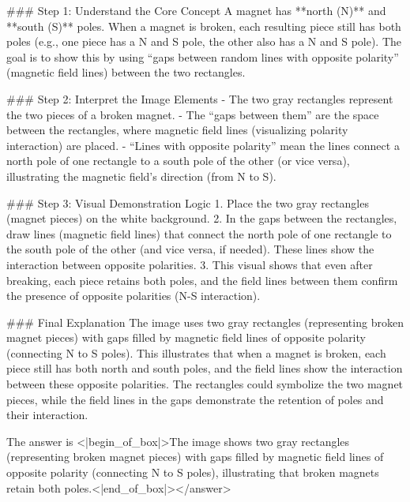 ### Step 1: Understand the Core Concept  
A magnet has **north (N)** and **south (S)** poles. When a magnet is broken, each resulting piece still has both poles (e.g., one piece has a N and S pole, the other also has a N and S pole). The goal is to show this by using “gaps between random lines with opposite polarity” (magnetic field lines) between the two rectangles.  


### Step 2: Interpret the Image Elements  
- The two gray rectangles represent the two pieces of a broken magnet.  
- The “gaps between them” are the space between the rectangles, where magnetic field lines (visualizing polarity interaction) are placed.  
- “Lines with opposite polarity” mean the lines connect a north pole of one rectangle to a south pole of the other (or vice versa), illustrating the magnetic field’s direction (from N to S).  


### Step 3: Visual Demonstration Logic  
1. Place the two gray rectangles (magnet pieces) on the white background.  
2. In the gaps between the rectangles, draw lines (magnetic field lines) that connect the north pole of one rectangle to the south pole of the other (and vice versa, if needed). These lines show the interaction between opposite polarities.  
3. This visual shows that even after breaking, each piece retains both poles, and the field lines between them confirm the presence of opposite polarities (N-S interaction).  


### Final Explanation  
The image uses two gray rectangles (representing broken magnet pieces) with gaps filled by magnetic field lines of opposite polarity (connecting N to S poles). This illustrates that when a magnet is broken, each piece still has both north and south poles, and the field lines show the interaction between these opposite polarities. The rectangles could symbolize the two magnet pieces, while the field lines in the gaps demonstrate the retention of poles and their interaction.  

The answer is <|begin_of_box|>The image shows two gray rectangles (representing broken magnet pieces) with gaps filled by magnetic field lines of opposite polarity (connecting N to S poles), illustrating that broken magnets retain both poles.<|end_of_box|></answer>